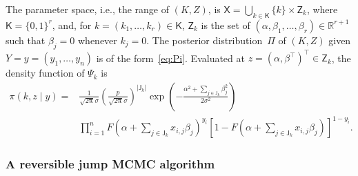 \documentclass[12pt]{article}
\newcommand{\X}{\mathsf{X}}
\newcommand{\Z}{\mathsf{Z}}
\begin{document}
The parameter space, i.e., the range of $(K,Z)$, is $\X = \bigcup_{k \in \mathsf{K}} \{k\} \times \Z_k$, where $\mathsf{K} = \{0,1\}^r$, and,
for $k = (k_1, \dots,k_r) \in \mathsf{K}$,
$\Z_k$ is the set of $(\alpha, \beta_1, \dots, \beta_r) \in \mathbb{R}^{r+1}$ such that $\beta_j = 0$ whenever $k_j = 0$.
The posterior distribution~$\Pi$ of $(K,Z)$ given $Y = y = (y_1, \dots, y_n)$ is of the form~\eqref{eq:Pi}.
Evaluated at $z = (\alpha,\beta^{\top})^{\top} \in \Z_k$, the density function of $\Psi_k$ is
\[
\begin{aligned}
	\pi(k, z \mid y) =& \frac{1}{\sqrt{2\bm{\pi}} \sigma} \left( \frac{p}{\sqrt{2 \bm{\pi}} \sigma} \right)^{|\mathsf{J}_k|} \exp \left( - \frac{ \alpha^2 + \sum_{j \in \mathsf{J}_k} \beta_j^2 }{2 \sigma^2} \right) \\
	&\prod_{i=1}^n F \left( \alpha + \sum_{j \in \mathsf{J}_k} x_{i,j} \beta_j \right)^{y_i} \left[ 1 - F \left( \alpha + \sum_{j \in \mathsf{J}_k} x_{i,j} \beta_j \right)  \right]^{1-y_i}.
\end{aligned}
\]



\subsubsection{A reversible jump MCMC algorithm}
\end{document}
